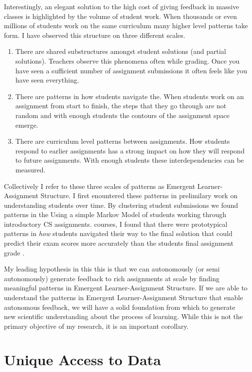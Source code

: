 Interestingly, an elegant solution to the high cost of giving feedback in massive classes is highlighted by the volume of student work. When thousands or even millions of students work on the same curriculum many higher level patterns take form. I have observed this structure on three different scales. 
\begin{enumerate}
\item There are shared substructures amongst student solutions (and partial solutions). Teachers observe this phenomena often while grading. Once you have seen a sufficient number of assignment submissions it often feels like you have seen everything. 
\item There are patterns in how students navigate the. When students work on an assignment from start to finish, the steps that they go through are not random and with enough students the contours of the assignment space emerge. 
\item There are curriculum level patterns between assignments. How students respond to earlier assignments has a strong impact on how they will respond to future assignments. With enough students these interdependencies can be measured.
\end{enumerate}
Collectively I refer to these three scales of patterns as Emergent Learner-Assignment Structure. I first enountered these patterns in prelimilary work on understanding students over time. By clustering student submissions we found patterns in the Using a simple Markov Model of students working through introductory CS assignments. courses, I found that there were prototypical patterns in \emph{how} students navigated their way to the final solution that could predict their exam scores more accurately than the students final assignment grade \cite{piech2012modeling}. 

My leading hypothesis in this this is that we can autonomously (or semi autonomously) generate feedback to rich assignments at scale by finding meaningful patterns in Emergent Learner-Assignment Structure. 
If we are able to understand the patterns in Emergent Learner-Assignment Structure that enable autonomous feedback, we will have a solid foundation from which to generate new scientific understanding about the process of learning. While this is not the primary objective of my research, it is an important corollary.




\section{Unique Access to Data}

